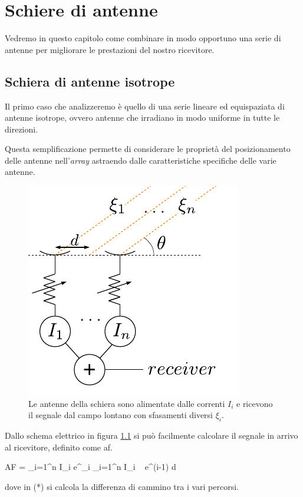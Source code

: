 \chapter{Schiere di antenne}

	Vedremo in questo capitolo come combinare in modo opportuno una serie di antenne per migliorare le prestazioni del nostro ricevitore.

\section{Schiera di antenne isotrope}
	Il primo caso che analizzeremo è quello di una serie lineare ed equispaziata di antenne isotrope, ovvero antenne che irradiano in modo uniforme in tutte le direzioni.

	Questa semplificazione permette di considerare le proprietà del posizionamento delle antenne nell'\emph{array} astraendo dalle caratteristiche specifiche delle varie antenne.

	\begin{figure}[ht]
		\centering
		\includegraphics{img/schiera_antenne.pdf}
		\caption{Le antenne della schiera sono alimentate dalle correnti $I_i$ e ricevono il segnale dal campo lontano con sfasamenti diversi $\xi_i$.}
		\label{fig:schiera}
	\end{figure}

	Dallo schema elettrico in figura \ref{fig:schiera} si può facilmente calcolare il segnale in arrivo al ricevitore, definito come \gls{af}.

	\begin{esp} \label{eq:array_factor}
		AF = \sum_{i=1}^n I_i e^{\jmath \xi_i}
			\stackrel{(*)}{=} \sum_{i=1}^n I_i ~ e^{\jmath (i-1) \beta d \cos \theta}
	\end{esp}
	dove in (*) si calcola la differenza di cammino tra i vari percorsi.

